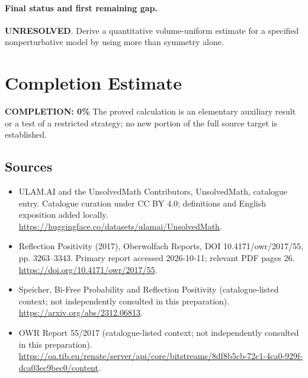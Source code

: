 \documentclass[11pt]{article}
\begin{document}
\paragraph{Final status and first remaining gap.}
\textbf{UNRESOLVED}. Derive a quantitative volume-uniform estimate for a specified nonperturbative model by using more than symmetry alone.

\section{Completion Estimate}
\noindent\textbf{COMPLETION: 0\%}
The proved calculation is an elementary auxiliary result or a test of a restricted strategy; no new portion of the full source target is established.

\subsection{Sources}
\begin{itemize}
\item[\hypertarget{source:statement:1}{S1}] ULAM.AI and the UnsolvedMath Contributors, UnsolvedMath, catalogue entry. Catalogue curation under CC BY 4.0; definitions and English exposition added locally.
\url{https://huggingface.co/datasets/ulamai/UnsolvedMath}.
\item[\hypertarget{source:statement:2}{S2}] Reflection Positivity (2017), Oberwolfach Reports, DOI 10.4171/owr/2017/55, pp. 3263--3343. Primary report accessed 2026-10-11; relevant PDF pages 26.
\url{https://doi.org/10.4171/owr/2017/55}.
\item[\hypertarget{source:statement:3}{S3}] Speicher, Bi-Free Probability and Reflection Positivity (catalogue-listed context; not independently consulted in this preparation).
\url{https://arxiv.org/abs/2312.06813}.
\item[\hypertarget{source:statement:4}{S4}] OWR Report 55/2017 (catalogue-listed context; not independently consulted in this preparation).
\url{https://oa.tib.eu/renate/server/api/core/bitstreams/8df8b5cb-72c1-4ca0-929f-dca03ec9bec0/content}.
\end{itemize}
\label{end:statement}
\end{document}
